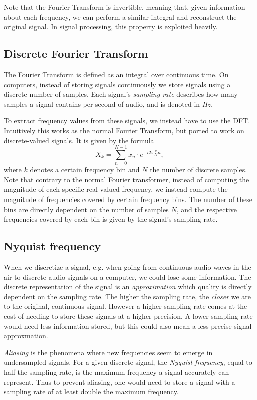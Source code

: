 Note that the Fourier Transform is invertible, meaning that, given information about each frequency, we can perform a similar integral and reconstruct the original signal. In signal processing, this property is exploited heavily.

\subsection{Discrete Fourier Transform}

The Fourier Transform is defined as an integral over continuous time. On computers, instead of storing signals continuously we store signals using a discrete number of samples. Each signal's \textit{sampling rate} describes how many samples a signal contains per second of audio, and is denoted in \textit{Hz}.

To extract frequency values from these signals, we instead have to use the \gls{DFT}. Intuitively this works as the normal Fourier Transform, but ported to work on discrete-valued signals. It is given by the formula \[ X_k = \sum^{N - 1}_{n=0}{x_n \cdot e^{-i 2\pi \frac{k}{N} n}}, \] where $k$ denotes a certain frequency bin and $N$ the number of discrete samples. Note that contrary to the normal Fourier transformer, instead of computing the magnitude of each specific real-valued frequency, we instead compute the magnitude of frequencies covered by certain frequency bins. The number of these bins are directly dependent on the number of samples $N$, and the respective frequencies covered by each bin is given by the signal's sampling rate.

\subsection{Nyquist frequency}

When we discretize a signal, e.g. when going from continuous audio waves in the air to discrete audio signals on a computer, we could lose some information. The discrete representation of the signal is an \textit{approximation} which quality is directly dependent on the sampling rate. The higher the sampling rate, the \textit{closer} we are to the original, continuous signal. However a higher sampling rate comes at the cost of needing to store these signals at a higher precision. A lower sampling rate would need less information stored, but this could also mean a less precise signal approxmation.

\textit{Aliasing} is the phenomena where new frequencies seem to emerge in undersampled signals. For a given discrete signal, the \textit{Nyquist frequency}, equal to half the sampling rate, is the maximum frequency a signal accurately can represent. Thus to prevent aliasing, one would need to store a signal with a sampling rate of at least double the maximum frequency.


